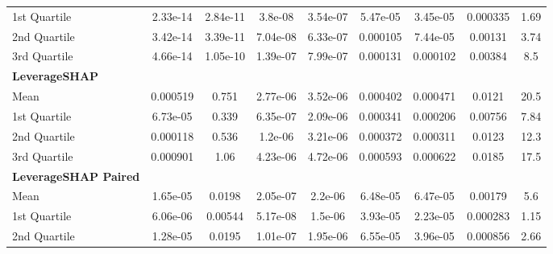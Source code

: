 {\begin{tabular} {lcccccccc}
\hspace{7pt}1st Quartile & \cellcolor{gold!60}2.33e-14 & \cellcolor{gold!60}2.84e-11 & \cellcolor{silver!60}3.8e-08 & \cellcolor{gold!60}3.54e-07 & \cellcolor{bronze!60}5.47e-05 & 3.45e-05 & \cellcolor{bronze!60}0.000335 & \cellcolor{bronze!60}1.69 \\ 
\hspace{7pt}2nd Quartile & \cellcolor{gold!60}3.42e-14 & \cellcolor{gold!60}3.39e-11 & \cellcolor{silver!60}7.04e-08 & \cellcolor{gold!60}6.33e-07 & 0.000105 & 7.44e-05 & \cellcolor{bronze!60}0.00131 & \cellcolor{bronze!60}3.74 \\ 
\hspace{7pt}3rd Quartile & \cellcolor{gold!60}4.66e-14 & \cellcolor{gold!60}1.05e-10 & \cellcolor{silver!60}1.39e-07 & \cellcolor{gold!60}7.99e-07 & 0.000131 & 0.000102 & \cellcolor{bronze!60}0.00384 & 8.5 \\ 
\addlinespace[1ex] 
\textbf{LeverageSHAP} &  &  &  &  &  &  &  &  \\ 
\hspace{7pt}Mean & 0.000519 & 0.751 & 2.77e-06 & 3.52e-06 & 0.000402 & 0.000471 & 0.0121 & 20.5 \\ 
\hspace{7pt}1st Quartile & 6.73e-05 & 0.339 & 6.35e-07 & 2.09e-06 & 0.000341 & 0.000206 & 0.00756 & 7.84 \\ 
\hspace{7pt}2nd Quartile & 0.000118 & 0.536 & 1.2e-06 & 3.21e-06 & 0.000372 & 0.000311 & 0.0123 & 12.3 \\ 
\hspace{7pt}3rd Quartile & 0.000901 & 1.06 & 4.23e-06 & 4.72e-06 & 0.000593 & 0.000622 & 0.0185 & 17.5 \\ 
\addlinespace[1ex] 
\textbf{LeverageSHAP Paired} &  &  &  &  &  &  &  &  \\ 
\hspace{7pt}Mean & \cellcolor{bronze!60}1.65e-05 & \cellcolor{bronze!60}0.0198 & \cellcolor{bronze!60}2.05e-07 & 2.2e-06 & \cellcolor{gold!60}6.48e-05 & \cellcolor{silver!60}6.47e-05 & \cellcolor{gold!60}0.00179 & \cellcolor{gold!60}5.6 \\ 
\hspace{7pt}1st Quartile & 6.06e-06 & \cellcolor{bronze!60}0.00544 & \cellcolor{bronze!60}5.17e-08 & 1.5e-06 & \cellcolor{silver!60}3.93e-05 & \cellcolor{gold!60}2.23e-05 & \cellcolor{silver!60}0.000283 & \cellcolor{silver!60}1.15 \\ 
\hspace{7pt}2nd Quartile & 1.28e-05 & 0.0195 & \cellcolor{bronze!60}1.01e-07 & \cellcolor{bronze!60}1.95e-06 & \cellcolor{silver!60}6.55e-05 & \cellcolor{gold!60}3.96e-05 & \cellcolor{gold!60}0.000856 & \cellcolor{gold!60}2.66 \\ 

\end{tabular}}
